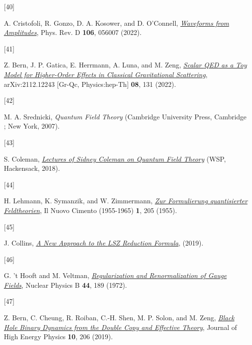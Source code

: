 \documentclass[
  10pt,
  a4paper,
  DIV=11,
  numbers=noendperiod,
  twoside]{scrreprt}
\newlength{\cslhangindent}
\newlength{\csllabelwidth}
\newlength{\cslentryspacingunit} %
\newenvironment{CSLReferences}[2] %
 {%
  \setlength{\parindent}{0pt}
  \ifodd #1
  \let\oldpar\par
  \def\par{\hangindent=\cslhangindent\oldpar}
  \fi
  \setlength{\parskip}{#2\cslentryspacingunit}
 }%
 {}
\newcommand{\CSLLeftMargin}[1]{\parbox[t]{\csllabelwidth}{#1}}
\newcommand{\CSLRightInline}[1]{\parbox[t]{\linewidth - \csllabelwidth}{#1}\break}
\DeclareRobustCommand{\[}{\begin{equation}}
\DeclareRobustCommand{\]}{\end{equation}}
\begin{document}
\begin{CSLReferences}{0}{0}
\leavevmode{}%
\CSLLeftMargin{{[}40{]} }%
\CSLRightInline{A. Cristofoli, R. Gonzo, D. A. Kosower, and D.
O'Connell,
\emph{\href{https://doi.org/10.1103/PhysRevD.106.056007}{Waveforms from
Amplitudes}}, Phys. Rev. D \textbf{106}, 056007 (2022).}

\leavevmode{}%
\CSLLeftMargin{{[}41{]} }%
\CSLRightInline{Z. Bern, J. P. Gatica, E. Herrmann, A. Luna, and M.
Zeng, \emph{\href{https://doi.org/10.1007/JHEP08(2022)131}{Scalar {QED}
as a Toy Model for Higher-Order Effects in Classical Gravitational
Scattering}}, arXiv:2112.12243 {[}Gr-Qc, Physics:hep-Th{]} \textbf{08},
131 (2022).}

\leavevmode{}%
\CSLLeftMargin{{[}42{]} }%
\CSLRightInline{M. A. Srednicki, \emph{Quantum Field Theory} ({Cambridge
University Press}, {Cambridge ; New York}, 2007).}

\leavevmode{}%
\CSLLeftMargin{{[}43{]} }%
\CSLRightInline{S. Coleman,
\emph{\href{https://doi.org/10.1142/9371}{Lectures of {Sidney Coleman}
on {Quantum Field Theory}}} ({WSP}, {Hackensack}, 2018).}

\leavevmode{}%
\CSLLeftMargin{{[}44{]} }%
\CSLRightInline{H. Lehmann, K. Symanzik, and W. Zimmermann,
\emph{\href{https://doi.org/10.1007/BF02731765}{{Zur Formulierung
quantisierter Feldtheorien}}}, Il Nuovo Cimento (1955-1965) \textbf{1},
205 (1955).}

\leavevmode{}%
\CSLLeftMargin{{[}45{]} }%
\CSLRightInline{J. Collins,
\emph{\href{https://arxiv.org/abs/1904.10923}{A New Approach to the
{LSZ} Reduction Formula}}, (2019).}

\leavevmode{}%
\CSLLeftMargin{{[}46{]} }%
\CSLRightInline{G. 't Hooft and M. Veltman,
\emph{\href{https://doi.org/10.1016/0550-3213(72)90279-9}{Regularization
and Renormalization of Gauge Fields}}, Nuclear Physics B \textbf{44},
189 (1972).}

\leavevmode{}%
\CSLLeftMargin{{[}47{]} }%
\CSLRightInline{Z. Bern, C. Cheung, R. Roiban, C.-H. Shen, M. P. Solon,
and M. Zeng, \emph{\href{https://doi.org/10.1007/JHEP10(2019)206}{Black
Hole Binary Dynamics from the Double Copy and Effective Theory}},
Journal of High Energy Physics \textbf{10}, 206 (2019).}


\end{CSLReferences}
\end{document}
